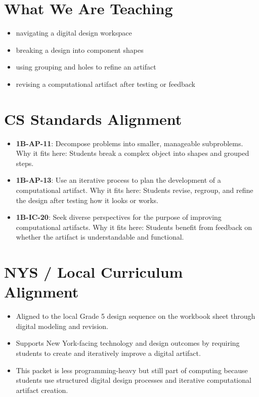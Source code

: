 \documentclass[11pt]{article}
\begin{document}
\section*{What We Are Teaching}
\begin{itemize}[leftmargin=*]
\item navigating a digital design workspace
\item breaking a design into component shapes
\item using grouping and holes to refine an artifact
\item revising a computational artifact after testing or feedback
\end{itemize}

\section*{CS Standards Alignment}
\begin{itemize}[leftmargin=*]
\item \textbf{1B-AP-11}: Decompose problems into smaller, manageable subproblems. Why it fits here: Students break a complex object into shapes and grouped steps.
\item \textbf{1B-AP-13}: Use an iterative process to plan the development of a computational artifact. Why it fits here: Students revise, regroup, and refine the design after testing how it looks or works.
\item \textbf{1B-IC-20}: Seek diverse perspectives for the purpose of improving computational artifacts. Why it fits here: Students benefit from feedback on whether the artifact is understandable and functional.
\end{itemize}

\section*{NYS / Local Curriculum Alignment}
\begin{itemize}[leftmargin=*]
\item Aligned to the local Grade 5 design sequence on the workbook sheet through digital modeling and revision.
\item Supports New York-facing technology and design outcomes by requiring students to create and iteratively improve a digital artifact.
\item This packet is less programming-heavy but still part of computing because students use structured digital design processes and iterative computational artifact creation.
\end{itemize}
\end{document}
